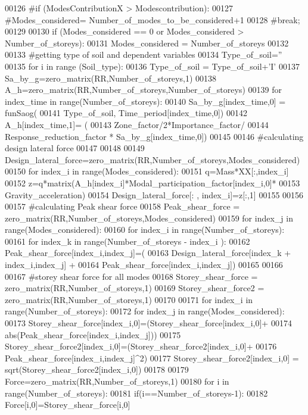 \begin{DoxyCode}
00126    #if (ModesContributionX > Modescontribution):
00127        #Modes\_considered= Number\_of\_modes\_to\_be\_considered+1
00128        #break;
00129        
00130 if (Modes\_considered == 0 or Modes\_considered > Number\_of\_storeys):
00131     Modes\_considered = Number\_of\_storeys
00132     
00133 #getting type of soil and dependent variables
00134 Type\_of\_soil=''
00135 for i in range (Soil\_type):
00136    Type\_of\_soil = Type\_of\_soil+'I'
00137 Sa\_by\_g=zero\_matrix(RR,Number\_of\_storeys,1)
00138 A\_h=zero\_matrix(RR,Number\_of\_storeys,Number\_of\_storeys)
00139 for index\_time in range(Number\_of\_storeys):
00140    Sa\_by\_g[index\_time,0] = funSaog(
00141    Type\_of\_soil, Time\_period[index\_time,0])
00142    A\_h[index\_time,1]= (
00143    Zone\_factor/2*Importance\_factor/
00144    Response\_reduction\_factor * Sa\_by\_g[index\_time,0])
00145 
00146 #calculating design lateral force
00147 
00148 
00149 Design\_lateral\_force=zero\_matrix(RR,Number\_of\_storeys,Modes\_considered)
00150 for index\_i in range(Modes\_considered):
00151     q=Mass*XX[:,index\_i]
00152     z=q*matrix(A\_h[index\_i]*Modal\_participation\_factor[index\_i,0]*
00153     Gravity\_acceleration)
00154     Design\_lateral\_force[: , index\_i]=z[:,1]
00155 
00156 
00157 #calculating Peak shear force
00158 Peak\_shear\_force = zero\_matrix(RR,Number\_of\_storeys,Modes\_considered)
00159 for index\_j in range(Modes\_considered):
00160    for index\_i in range(Number\_of\_storeys):
00161        for index\_k in range(Number\_of\_storeys - index\_i ):
00162            Peak\_shear\_force[index\_i,index\_j]=(
00163            Design\_lateral\_force[index\_k + index\_i,index\_j] +
00164             Peak\_shear\_force[index\_i,index\_j])
00165 
00166 
00167 #storey shear force for all modes
00168 Storey\_shear\_force = zero\_matrix(RR,Number\_of\_storeys,1)
00169 Storey\_shear\_force2 = zero\_matrix(RR,Number\_of\_storeys,1)
00170 
00171 for index\_i in range(Number\_of\_storeys):
00172     for index\_j in range(Modes\_considered):
00173         Storey\_shear\_force[index\_i,0]=(Storey\_shear\_force[index\_i,0]+
00174         abs(Peak\_shear\_force[index\_i,index\_j]))
00175         Storey\_shear\_force2[index\_i,0]=(Storey\_shear\_force2[index\_i,0]+
00176         Peak\_shear\_force[index\_i,index\_j]^2)
00177     Storey\_shear\_force2[index\_i,0] = sqrt(Storey\_shear\_force2[index\_i,0])
00178     
00179 Force=zero\_matrix(RR,Number\_of\_storeys,1)
00180 for i in range(Number\_of\_storeys):
00181    if(i==Number\_of\_storeys-1):
00182        Force[i,0]=Storey\_shear\_force[i,0]

\end{DoxyCode}
